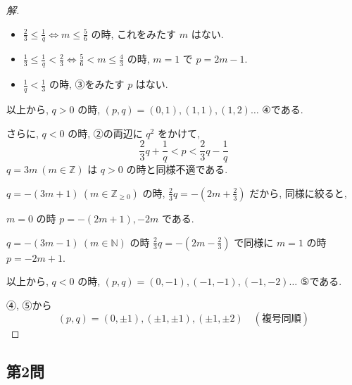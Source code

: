 \documentclass[../main.tex]{subfiles}
\begin{document}
\begin{proof}[解]
  \begin{itemize}
    \item $\frac{2}{3} \le \frac{1}{q} \iff m \le \frac{5}{6}$ の時, これをみたす $m$ はない.
    \item $\frac{1}{3} \le \frac{1}{q} < \frac{2}{3} \iff \frac{5}{6} < m \le \frac{4}{3}$ の時, $m=1$ で $p = 2m-1$.
    \item $\frac{1}{q} < \frac{1}{3}$ の時, ③をみたす $p$ はない.
  \end{itemize}

  以上から, $q > 0$ の時, $(p,q) = (0,1), (1,1), (1,2) \dots$ ④である.

  さらに, $q < 0$ の時, ②の両辺に $q^2$ をかけて,
  \[ \frac{2}{3}q + \frac{1}{q} < p < \frac{2}{3}q - \frac{1}{q} \]
  $q = 3m \ (m \in \mathbb{Z})$ は $q > 0$ の時と同様不適である.

  $q = -(3m+1) \ (m \in \mathbb{Z}_{\ge 0})$ の時, $\frac{2}{3}q = -(2m + \frac{2}{3})$ だから, 同様に絞ると,

  \begin{center}
  \end{center}

  $m=0$ の時 $p = -(2m+1), -2m$ である.

  $q = -(3m-1) \ (m \in \mathbb{N})$ の時 $\frac{2}{3}q = -(2m - \frac{2}{3})$ で同様に $m=1$ の時 $p = -2m+1$.

  以上から, $q < 0$ の時, $(p,q) = (0,-1), (-1,-1), (-1,-2) \dots$ ⑤である.

  ④, ⑤から
  \[ (p,q) = (0, \pm 1), (\pm 1, \pm 1), (\pm 1, \pm 2) \quad (\text{複号同順}) \]
\end{proof}

\newpage

\subsection*{第2問}
\end{document}
